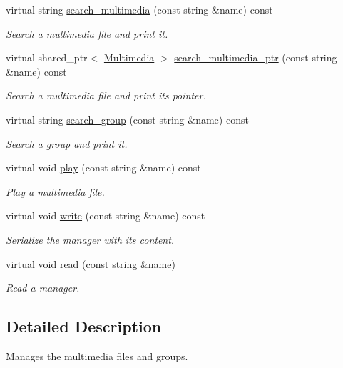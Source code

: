 \begin{DoxyCompactItemize}
virtual string \hyperlink{class_multimedia_manager_aa936143b04d97ea3b74c7016482512b9}{search\-\_\-multimedia} (const string \&name) const 
\begin{DoxyCompactList}\small\item\em Search a multimedia file and print it. \end{DoxyCompactList}\item 
virtual shared\-\_\-ptr$<$ \hyperlink{class_multimedia}{Multimedia} $>$ \hyperlink{class_multimedia_manager_a6e6fb41d321267cde7229fe7d1fa3ba7}{search\-\_\-multimedia\-\_\-ptr} (const string \&name) const 
\begin{DoxyCompactList}\small\item\em Search a multimedia file and print its pointer. \end{DoxyCompactList}\item 
virtual string \hyperlink{class_multimedia_manager_a39a4fc5cd5163e01f112bd474ef76e1b}{search\-\_\-group} (const string \&name) const 
\begin{DoxyCompactList}\small\item\em Search a group and print it. \end{DoxyCompactList}\item 
virtual void \hyperlink{class_multimedia_manager_ad99e3dfbf0ad3f9e1a7423f89ad0f45a}{play} (const string \&name) const 
\begin{DoxyCompactList}\small\item\em Play a multimedia file. \end{DoxyCompactList}\item 
virtual void \hyperlink{class_multimedia_manager_a11c103cd8ec48581c81a522629d536b7}{write} (const string \&name) const 
\begin{DoxyCompactList}\small\item\em Serialize the manager with its content. \end{DoxyCompactList}\item 
virtual void \hyperlink{class_multimedia_manager_ae6830452883cc26ab9f89d20c024553a}{read} (const string \&name)
\begin{DoxyCompactList}\small\item\em Read a manager. \end{DoxyCompactList}\end{DoxyCompactItemize}


\subsection{Detailed Description}
Manages the multimedia files and groups. 

